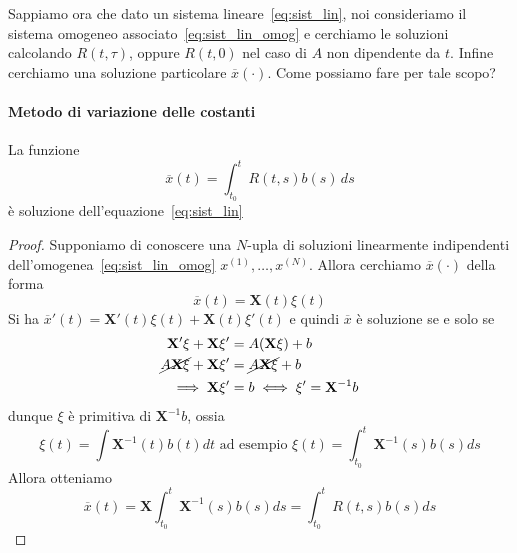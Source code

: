 Sappiamo ora che dato un sistema lineare~\eqref{eq:sist_lin}, noi consideriamo
il sistema omogeneo associato~\eqref{eq:sist_lin_omog} e cerchiamo le soluzioni
calcolando \(R{(t, \tau)}\), oppure \(R{(t, 0)}\) nel caso di \(A\) non
dipendente da \(t\). Infine cerchiamo una soluzione particolare
\(\overline{x}{(\cdot )}\). Come possiamo fare per tale scopo?

\paragraph{Metodo di variazione delle costanti}
\begin{proposition}
    La funzione
    \[
        \overline{x}{(t)} = \int_{t_{0}}^{t} R{(t, s)}b{(s)}\,ds
  \]
  è soluzione dell'equazione~\eqref{eq:sist_lin} 
\end{proposition}
\begin{proof}
Supponiamo di conoscere una \(N\)-upla di soluzioni linearmente indipendenti
dell'omogenea~\eqref{eq:sist_lin_omog} \(x^{{(1)}}, \dots, x^{{(N)}}\). Allora
cerchiamo \(\overline{x}{(\cdot )}\) della forma
\[
  \overline{x}{(t)} = \mathbf{X} {(t)}\xi{(t)}
\]
Si ha \(\overline{x}'{(t)} = \mathbf{X}'{(t)}\xi {(t)} + \mathbf{X} {(t)}
\xi'{(t)}\) e quindi \(\overline{x}\) è soluzione se e solo se
\begin{align*}
    \mathbf{X}'\xi + \mathbf{X} \xi' &= A{(\mathbf{X} \xi)} + b \\
    \cancel{A\mathbf{X} \xi} + \mathbf{X} \xi' &= \cancel{A\mathbf{X} \xi}+ b \\
    \implies \mathbf{X} \xi' &= b \iff \xi' = \mathbf{X}^{-1} b
\end{align*}
dunque
\(\xi\) è primitiva di \(\mathbf{X}^{-1}b\), ossia 
\[
    \xi{(t)} = \int \mathbf{X}^{-1}{(t)} b{(t)} dt \text{ ad esempio } \xi{(t)} =
    \int_{t_{0}}^{t} \mathbf{X}^{-1}{(s)}b{(s)}ds
\]
Allora otteniamo
\[
    \overline{x}{(t)} = \mathbf{X} \int_{t_{0}}^{t} \mathbf{X}^{-1}{(s)}b{(s)}ds
    = \int_{t_{0}}^{t} R{(t, s)}b{(s)}ds
\]
\end{proof}

